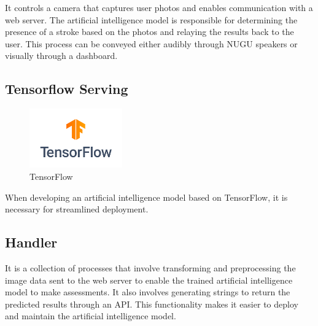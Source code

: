 It controls a camera that captures user photos and enables communication with a web server. The artificial intelligence model is responsible for determining the presence of a stroke based on the photos and relaying the results back to the user. This process can be conveyed either audibly through NUGU speakers or visually through a dashboard.\\

\subsection{Tensorflow Serving}

\begin{figure}[htp]
\centering
\includegraphics[width=4cm]{images/tensorflow.png}
\caption{TensorFlow}
\label{fig:tensorflow}
\end{figure}

When developing an artificial intelligence model based on TensorFlow, it is necessary for streamlined deployment.\\

\subsection{Handler}
It is a collection of processes that involve transforming and preprocessing the image data sent to the web server to enable the trained artificial intelligence model to make assessments. It also involves generating strings to return the predicted results through an API. This functionality makes it easier to deploy and maintain the artificial intelligence model.\\

